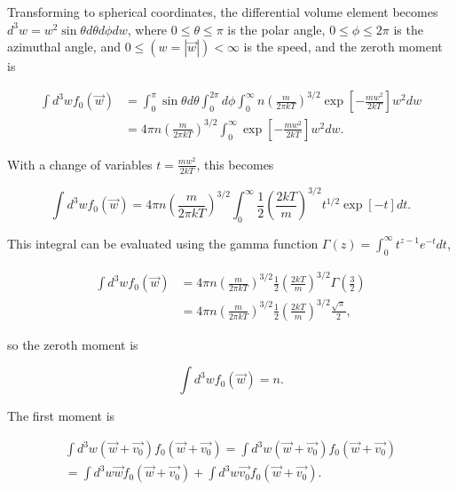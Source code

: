 \documentclass{hw-template}
\begin{document}
Transforming to spherical coordinates, the differential volume element becomes $d^3w = w^2 \sin \theta d\theta d\phi dw$, where $0\leq \theta \leq \pi$ is the polar angle, $0\leq \phi \leq 2\pi$ is the azimuthal angle, and $0 \leq (w = |\vec{w}|) < \infty$ is the speed, and the zeroth moment is

\begin{subequations}
    \begin{align}
    \int d^3w f_0(\vec{w})  &= \int_{0}^{\pi} \sin \theta d \theta \int_{0}^{2\pi} d\phi \int_{0}^{\infty}   n{\left( \frac{m}{2\pi k T} \right)}^{3/2} \exp \left[ -\frac{m w^2}{2kT}\right]w^2 dw\\
        &= 4\pi n{\left( \frac{m}{2\pi k T} \right)}^{3/2}\int_{0}^{\infty}    \exp \left[ -\frac{m w^2}{2kT}\right]w^2 dw.
\end{align}
\end{subequations}

With a change of variables $t = \frac{m w^2}{2kT}$, this becomes

\begin{equation}
    \int d^3w f_0(\vec{w}) = 4\pi n{\left( \frac{m}{2\pi k T} \right)}^{3/2}\int_{0}^{\infty} \frac{1}{2}  \left( \frac{2kT}{m} \right)^{3/2} t^{1/2}  \exp \left[ -t\right] dt.
\end{equation}

This integral can be evaluated using the gamma function $\Gamma(z) = \int_{0}^{\infty} t^{z-1}e^{-t}dt$, 

\begin{align}
    \int d^3w f_0(\vec{w}) &= 4\pi n{\left( \frac{m}{2\pi k T} \right)}^{3/2}\frac{1}{2}  \left( \frac{2kT}{m} \right)^{3/2} \Gamma\left( \frac{3}{2}\right)\\
    &= 4\pi n{\left( \frac{m}{2\pi k T} \right)}^{3/2}\frac{1}{2}  \left( \frac{2kT}{m} \right)^{3/2} \frac{\sqrt{\pi}}{2},
\end{align}

so the zeroth moment is


\begin{equation}
    \boxed{\int d^3w f_0(\vec{w}) = n}.
\end{equation}



The first moment is

\begin{multline}
    \int d^3w (\vec{w} + \vec{v_0}) f_0(\vec{w} + \vec{v_0}) = \int d^3w \left(\vec{w} + \vec{v_0} \right) f_0 (\vec{w} + \vec{v_0}) \\
    = \int d^3w \vec{w} f_0 (\vec{w} + \vec{v_0}) + \int d^3 w \vec{v_0} f_0 (\vec{w} + \vec{v_0}).
\end{multline}
\end{document}

